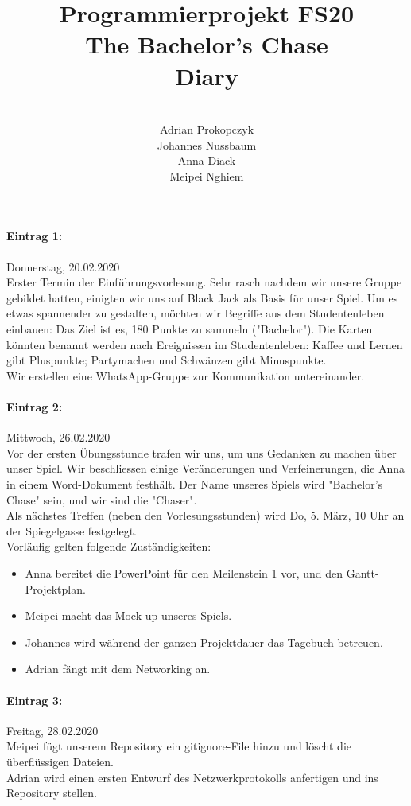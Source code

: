 \documentclass[12pt]{article}
\title{Programmierprojekt FS20\\The Bachelor's Chase\\Diary}
\author{\\Adrian Prokopczyk\\Johannes Nussbaum\\Anna Diack\\Meipei Nghiem}
\begin{document}
\begin{titlepage}
\maketitle
\end{titlepage}

\setcounter{tocdepth}{2}


\paragraph{Eintrag 1:}
Donnerstag, 20.02.2020 \\
Erster Termin der Einf\"uhrungsvorlesung. Sehr rasch nachdem wir unsere Gruppe gebildet hatten, einigten wir uns auf Black Jack als Basis f\"ur unser Spiel. Um es etwas spannender zu gestalten, m\"ochten wir Begriffe aus dem Studentenleben einbauen: Das Ziel ist es, 180 Punkte zu sammeln ("Bachelor"). Die Karten k\"onnten benannt werden nach Ereignissen im Studentenleben: Kaffee und Lernen gibt Pluspunkte; Partymachen und Schw\"anzen gibt Minuspunkte.\\
Wir erstellen eine WhatsApp-Gruppe zur Kommunikation untereinander.

\paragraph{Eintrag 2:}
Mittwoch, 26.02.2020\\
Vor der ersten \"Ubungsstunde trafen wir uns, um uns Gedanken zu machen \"uber unser Spiel. Wir beschliessen einige Ver\"anderungen und Verfeinerungen, die Anna in einem Word-Dokument festh\"alt. Der Name unseres Spiels wird "Bachelor's Chase" sein, und wir sind die "Chaser".\\
Als n\"achstes Treffen (neben den Vorlesungsstunden) wird Do, 5. M\"arz, 10 Uhr an der Spiegelgasse festgelegt.\\
Vorl\"aufig gelten folgende Zust\"andigkeiten:
\begin{itemize}
\item Anna bereitet die PowerPoint f\"ur den Meilenstein 1 vor, und den Gantt-Projektplan.
\item Meipei macht das Mock-up unseres Spiels.
\item Johannes wird w\"ahrend der ganzen Projektdauer das Tagebuch betreuen.
\item Adrian f\"angt mit dem Networking an.
\end{itemize}

\paragraph{Eintrag 3:}
Freitag, 28.02.2020\\
Meipei f\"ugt unserem Repository ein gitignore-File hinzu und l\"oscht die \"uberfl\"ussigen Dateien.\\
Adrian wird einen ersten Entwurf des Netzwerkprotokolls anfertigen und ins Repository stellen.
\end{document}

